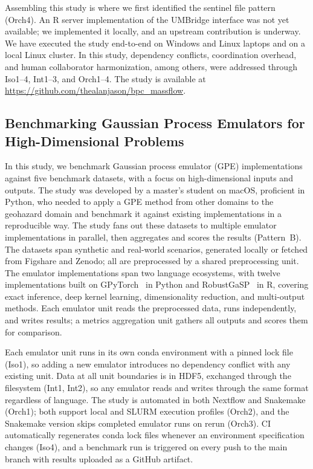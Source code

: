 \documentclass{eceasst}
\begin{document}
Assembling this study is where we first identified the sentinel file pattern (Orch4).
An R server implementation of the UMBridge interface was not yet available; we implemented it locally, and an upstream contribution is underway.
We have executed the study end-to-end on Windows and Linux laptops and on a
local Linux cluster.
In this study, dependency conflicts, coordination overhead, and human collaborator harmonization, among others, were addressed through Iso1--4, Int1--3, and Orch1--4.
The study is available at \url{https://github.com/thealanjason/bpc_massflow}.

\subsection{Benchmarking Gaussian Process Emulators for High-Dimensional Problems}
\label{sec:usecase:gpe}

In this study, we benchmark Gaussian process emulator (GPE) implementations against five benchmark datasets,
with a focus on high-dimensional inputs and outputs.
The study was developed by a master's student on macOS, proficient in Python, who
needed to apply a GPE method from other domains to the geohazard domain and
benchmark it against existing implementations in a reproducible way.
The study fans out these datasets to multiple emulator implementations in
parallel, then aggregates and scores the results (Pattern~B).
The datasets span synthetic and real-world scenarios, generated locally or
fetched from Figshare and Zenodo; all are preprocessed by a shared
preprocessing unit.
The emulator implementations span two language ecosystems, with twelve
implementations built on GPyTorch~\cite{gpytorch} in Python and
RobustGaSP~\cite{robustgasp} in R, covering exact inference, deep kernel
learning, dimensionality reduction, and multi-output methods.
Each emulator unit reads the preprocessed data, runs independently, and writes
results; a metrics aggregation unit gathers all outputs and scores them for
comparison.

Each emulator unit runs in its own conda environment with a pinned lock file
(Iso1), so adding a new emulator introduces no dependency conflict with any
existing unit.
Data at all unit boundaries is in HDF5, exchanged through the filesystem
(Int1, Int2), so any emulator reads and writes through the same format
regardless of language.
The study is automated in both Nextflow and Snakemake (Orch1); both support
local and SLURM execution profiles (Orch2), and the Snakemake version skips
completed emulator runs on rerun (Orch3).
CI automatically regenerates conda lock files whenever an environment
specification changes (Iso4), and a benchmark run is triggered on every push to
the main branch with results uploaded as a GitHub artifact.
\end{document}
